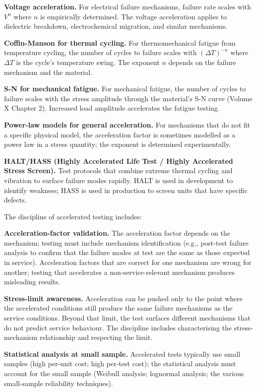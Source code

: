 \textbf{Voltage acceleration.} For electrical failure mechanisms, failure rate scales with $V^n$ where $n$ is empirically determined. The voltage acceleration applies to dielectric breakdown, electrochemical migration, and similar mechanisms.

\textbf{Coffin-Manson for thermal cycling.} For thermomechanical fatigue from temperature cycling, the number of cycles to failure scales with $(\Delta T)^{-n}$ where $\Delta T$ is the cycle's temperature swing. The exponent $n$ depends on the failure mechanism and the material.

\textbf{S-N for mechanical fatigue.} For mechanical fatigue, the number of cycles to failure scales with the stress amplitude through the material's S-N curve (Volume X Chapter 2). Increased load amplitude accelerates the fatigue testing.

\textbf{Power-law models for general acceleration.} For mechanisms that do not fit a specific physical model, the acceleration factor is sometimes modelled as a power law in a stress quantity; the exponent is determined experimentally.

\textbf{HALT/HASS (Highly Accelerated Life Test / Highly Accelerated Stress Screen).} Test protocols that combine extreme thermal cycling and vibration to surface failure modes rapidly. HALT is used in development to identify weakness; HASS is used in production to screen units that have specific defects.

The discipline of accelerated testing includes:

\textbf{Acceleration-factor validation.} The acceleration factor depends on the mechanism; testing must include mechanism identification (e.g., post-test failure analysis to confirm that the failure modes at test are the same as those expected in service). Acceleration factors that are correct for one mechanism are wrong for another; testing that accelerates a non-service-relevant mechanism produces misleading results.

\textbf{Stress-limit awareness.} Acceleration can be pushed only to the point where the accelerated conditions still produce the same failure mechanisms as the service conditions. Beyond that limit, the test surfaces different mechanisms that do not predict service behaviour. The discipline includes characterising the stress-mechanism relationship and respecting the limit.

\textbf{Statistical analysis at small sample.} Accelerated tests typically use small samples (high per-unit cost; high per-test cost); the statistical analysis must account for the small sample (Weibull analysis; lognormal analysis; the various small-sample reliability techniques).


